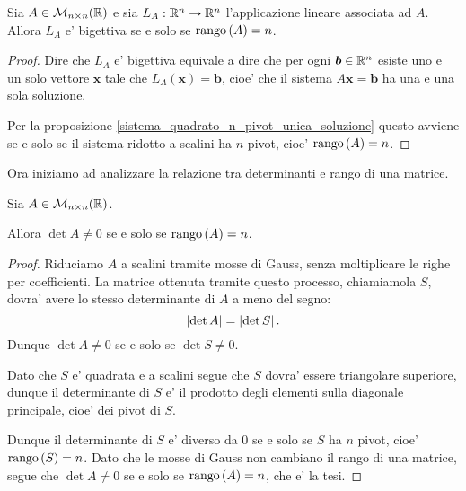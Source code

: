 \begin{proposition}
    Sia $A \in \mathcal{M}_{n \times n}(\mathbb{R})$ e sia $L_A : \mathbb{R}^n \to \mathbb{R}^n$ l'applicazione lineare associata ad $A$. Allora $L_A$ e' bigettiva se e solo se $\operatorname{rango}\left( A \right) = n$.
\end{proposition}
\begin{proof}
    Dire che $L_A$ e' bigettiva equivale a dire che per ogni $\bm b \in \mathbb{R}^n$ esiste uno e un solo vettore $\bm x$ tale che $L_A(\bm x) = \bm b$, cioe' che il sistema $A\bm x = \bm b$ ha una e una sola soluzione.

    Per la proposizione \ref{sistema_quadrato_n_pivot_unica_soluzione} questo avviene se e solo se il sistema ridotto a scalini ha $n$ pivot, cioe' $\operatorname{rango}\left( A \right) = n$. 
\end{proof}

Ora iniziamo ad analizzare la relazione tra determinanti e rango di una matrice.

\begin{theorem}\label{det_nonnullo_sse_rango_n}
    Sia $A \in \mathcal{M}_{n \times n}(\mathbb{R})$. 
    
    Allora $\det A \neq 0$ se e solo se $\operatorname{rango}\left( A \right) = n$.
\end{theorem}
\begin{proof}
    Riduciamo $A$ a scalini tramite mosse di Gauss, senza moltiplicare le righe per coefficienti. La matrice ottenuta tramite questo processo, chiamiamola $S$, dovra' avere lo stesso determinante di $A$ a meno del segno: \[
        \left|\det A\right| = \left|\det S\right|.
    \] Dunque $\det A \neq 0$ se e solo se $\det S \neq 0$. 
    
    Dato che $S$ e' quadrata e a scalini segue che $S$ dovra' essere triangolare superiore, dunque il determinante di $S$ e' il prodotto degli elementi sulla diagonale principale, cioe' dei pivot di $S$.
    
    Dunque il determinante di $S$ e' diverso da $0$ se e solo se $S$ ha $n$ pivot, cioe' $\operatorname{rango}\left( S \right) = n$. Dato che le mosse di Gauss non cambiano il rango di una matrice, segue che $\det A \neq 0$ se e solo se $\operatorname{rango}\left( A \right) = n$, che e' la tesi.
\end{proof}

